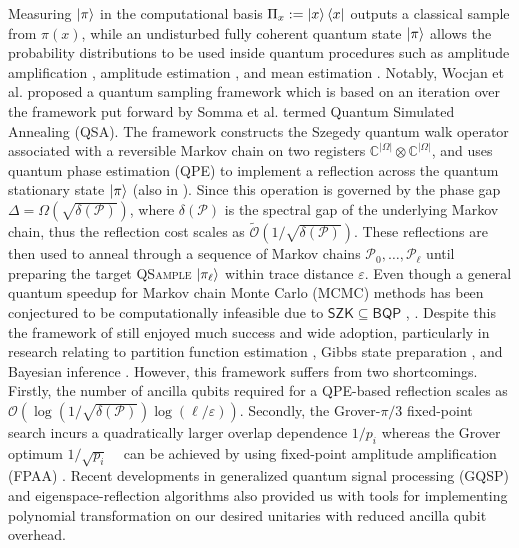 \documentclass[10pt,conference]{IEEEtran}
\theoremstyle{plain}
\theoremstyle{remark}
\begin{document}
Measuring \(\ket{\pi}\) in the computational basis $\Pi_x:=\ket{x}\bra{x}$ outputs a classical sample from \(\pi(x)\), while an undisturbed fully coherent quantum state \(\ket{\pi}\) allows the probability distributions to be used inside quantum procedures such as amplitude amplification \cite{Brassard_2002}, amplitude estimation \cite{montanaro_quantum_2015}, and mean estimation \cite{Cornelissen_2022}. Notably, Wocjan et al. \cite{wocjan_speed-up_2008} proposed a quantum sampling framework which is based on an iteration over the framework put forward by Somma et al. \cite{Somma_2007} termed Quantum Simulated Annealing (QSA). The framework constructs the Szegedy quantum walk operator \cite{Szegedy2004} associated with a reversible Markov chain on two registers $\mathbb{C}^{|\Omega|}\otimes \mathbb{C}^{|\Omega|}$, and uses quantum phase estimation (QPE) to implement a reflection across the quantum stationary state \(\ket{\pi}\) (also in \cite{Magniez_2011}). Since this operation is governed by the phase gap \(\Delta=\Omega(\sqrt{\delta(\mathcal{P})})\), where \(\delta(\mathcal{P})\) is the spectral gap of the underlying Markov chain, thus the reflection cost scales as \(\widetilde{\mathcal{O}}(1/\sqrt{\delta(\mathcal{P})})\). These reflections are then used to anneal through a sequence of Markov chains \(\mathcal{P}_0,\ldots,\mathcal{P}_{\ell}\) until preparing the target \textsc{QSample} \(\ket{\pi_{\ell}}\) within trace distance \(\varepsilon\). Even though a general quantum speedup for Markov chain Monte Carlo (MCMC) methods has been conjectured to be computationally infeasible due to \(\mathsf{SZK} \subseteq \mathsf{BQP}\) \cite{AharonovTaShma2003}, \cite{aaronson2001quantumlowerboundcollision}. Despite this the framework of \cite{wocjan_speed-up_2008} still enjoyed much success and wide adoption, particularly in research relating to partition function estimation \cite{montanaro_quantum_2015, SVV, cornelissen_sublinear-time_2023, Arunachalam_2022}, Gibbs state preparation \cite{wocjan_quantum_2009}, and Bayesian inference \cite{Harrow_2020}. However, this framework suffers from two shortcomings. Firstly, the number of ancilla qubits required for a QPE-based reflection scales as $\mathcal{O}(\log(1/\sqrt{\delta(\mathcal{P})})\log(\ell/\varepsilon))$. Secondly, the Grover-\(\pi/3\) fixed-point search incurs a quadratically larger overlap dependence \(1/p_i\) whereas the Grover optimum \(1/\sqrt{p_i}\) ~\cite{grover1996fastquantummechanicalalgorithm}   can be achieved by using fixed-point amplitude amplification (FPAA) \cite{Yoder_2014}. Recent developments in generalized quantum signal processing (GQSP) \cite{MotlaghWiebe2024GQSP} and eigenspace-reflection algorithms \cite{claudon2025simplealgorithmreflecteigenspaces} also provided us with tools for implementing polynomial transformation on our desired unitaries with reduced ancilla qubit overhead. 
\end{document}
